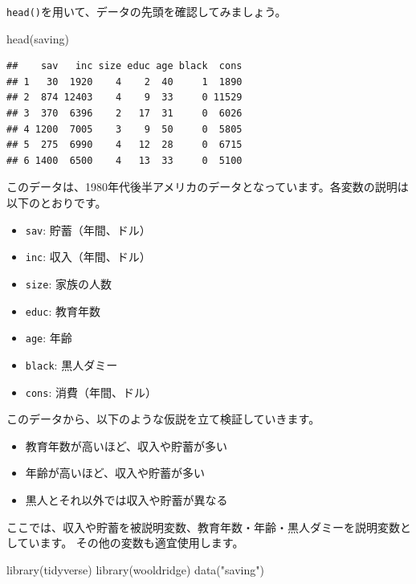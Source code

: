 \documentclass[
]{book}
\newenvironment{Shaded}{\begin{snugshade}}{\end{snugshade}}
\newcommand{\FunctionTok}[1]{\textcolor[rgb]{0.00,0.00,0.00}{#1}}
\newcommand{\NormalTok}[1]{#1}
\newcommand{\StringTok}[1]{\textcolor[rgb]{0.31,0.60,0.02}{#1}}
\providecommand{\tightlist}{%
  \setlength{\itemsep}{0pt}\setlength{\parskip}{0pt}}
\begin{document}
\texttt{head()}を用いて、データの先頭を確認してみましょう。

\begin{Shaded}
\begin{Highlighting}[]
\FunctionTok{head}\NormalTok{(saving)}
\end{Highlighting}
\end{Shaded}

\begin{verbatim}
##    sav   inc size educ age black  cons
## 1   30  1920    4    2  40     1  1890
## 2  874 12403    4    9  33     0 11529
## 3  370  6396    2   17  31     0  6026
## 4 1200  7005    3    9  50     0  5805
## 5  275  6990    4   12  28     0  6715
## 6 1400  6500    4   13  33     0  5100
\end{verbatim}

このデータは、1980年代後半アメリカのデータとなっています。各変数の説明は以下のとおりです。

\begin{itemize}
\tightlist
\item
  \texttt{sav}: 貯蓄（年間、ドル）
\item
  \texttt{inc}: 収入（年間、ドル）
\item
  \texttt{size}: 家族の人数
\item
  \texttt{educ}: 教育年数
\item
  \texttt{age}: 年齢
\item
  \texttt{black}: 黒人ダミー
\item
  \texttt{cons}: 消費（年間、ドル）
\end{itemize}

このデータから、以下のような仮説を立て検証していきます。

\begin{itemize}
\tightlist
\item
  教育年数が高いほど、収入や貯蓄が多い
\item
  年齢が高いほど、収入や貯蓄が多い
\item
  黒人とそれ以外では収入や貯蓄が異なる
\end{itemize}

ここでは、収入や貯蓄を被説明変数、教育年数・年齢・黒人ダミーを説明変数としています。
その他の変数も適宜使用します。

\begin{Shaded}
\begin{Highlighting}[]
\FunctionTok{library}\NormalTok{(tidyverse)}
\FunctionTok{library}\NormalTok{(wooldridge)}
\FunctionTok{data}\NormalTok{(}\StringTok{"saving"}\NormalTok{)}
\end{Highlighting}
\end{Shaded}
\end{document}

